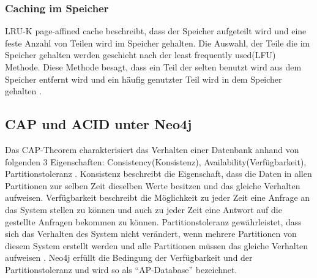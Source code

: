 \subsubsection{Caching im Speicher}
LRU-K page-affined cache beschreibt, dass der Speicher aufgeteilt wird und eine feste Anzahl von Teilen wird im Speicher gehalten. Die Auswahl, der Teile die im Speicher gehalten werden geschieht nach der least frequently used(LFU) Methode. Diese Methode besagt, dass ein Teil der selten benutzt wird aus dem Speicher entfernt wird und ein häufig genutzter Teil wird in dem Speicher gehalten \parencite{robinson2013graph}.
\subsection{CAP und ACID unter Neo4j}
Das CAP-Theorem charakterisiert  das Verhalten einer Datenbank anhand von folgenden 3 Eigenschaften: Consistency(Konsistenz), Availability(Verfügbarkeit), Partitionstoleranz \parencite{simon2000brewer}. Konsistenz beschreibt die Eigenschaft, dass die Daten in allen Partitionen zur selben Zeit dieselben Werte besitzen und das gleiche Verhalten aufweisen. Verfügbarkeit beschreibt die Möglichkeit zu jeder Zeit eine Anfrage an das System stellen zu können und auch zu jeder Zeit eine Antwort auf die gestellte Anfragen bekommen zu können. Partitionstoleranz gewährleistet, dass sich das Verhalten des System nicht verändert, wenn mehrere Partitionen von diesem System erstellt werden und alle Partitionen müssen das gleiche Verhalten aufweisen  \parencite{simon2000brewer}. Neo4j erfüllt die Bedingung der Verfügbarkeit und der  Partitionstoleranz \parencite{vukotic2015neo4j} und wird so als “AP-Database” bezeichnet. \newline
